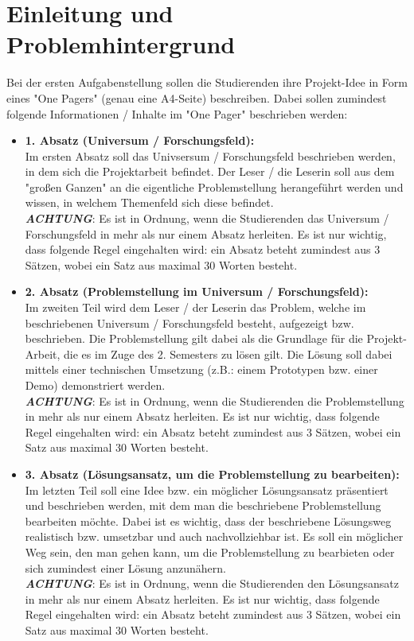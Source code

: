 \section{Einleitung und Problemhintergrund}

Bei der ersten Aufgabenstellung sollen die Studierenden ihre Projekt-Idee in Form eines "One Pagers" (genau eine A4-Seite) beschreiben. Dabei sollen zumindest folgende Informationen / Inhalte im "One Pager" beschrieben werden:
\begin{itemize}
	\item\textbf{1. Absatz (Universum / Forschungsfeld): } \\
	Im ersten Absatz soll das Univsersum / Forschungsfeld beschrieben werden, in dem sich die Projektarbeit befindet. Der Leser / die Leserin soll aus dem "großen Ganzen" an die eigentliche Problemstellung herangeführt werden und wissen, in welchem Themenfeld sich diese befindet. \\
	
	\textbf{\textit{ACHTUNG}}: Es ist in Ordnung, wenn die Studierenden das Universum / Forschungsfeld in mehr als nur einem Absatz herleiten. Es ist nur wichtig, dass folgende Regel eingehalten wird: ein Absatz beteht zumindest aus 3 Sätzen, wobei ein Satz aus maximal 30 Worten besteht.\\
	
	\item\textbf{2. Absatz (Problemstellung im Universum / Forschungsfeld): } \\
	Im zweiten Teil wird dem Leser / der Leserin das Problem, welche im beschriebenen Universum / Forschungsfeld besteht, aufgezeigt bzw. beschrieben. Die Problemstellung gilt dabei als die Grundlage für die Projekt-Arbeit, die es im Zuge des 2. Semesters zu lösen gilt. Die Lösung soll dabei mittels einer technischen Umsetzung (z.B.: einem Prototypen bzw. einer Demo) demonstriert werden. \\
	
	\textbf{\textit{ACHTUNG}}: Es ist in Ordnung, wenn die Studierenden die Problemstellung in mehr als nur einem Absatz herleiten. Es ist nur wichtig, dass folgende Regel eingehalten wird: ein Absatz beteht zumindest aus 3 Sätzen, wobei ein Satz aus maximal 30 Worten besteht.\\
	
	\item\textbf{3. Absatz (Lösungsansatz, um die Problemstellung zu bearbeiten): } \\
	Im letzten Teil soll eine Idee bzw. ein möglicher Lösungsansatz präsentiert und beschrieben werden, mit dem man die beschriebene Problemstellung bearbeiten möchte. Dabei ist es wichtig, dass der beschriebene Lösungsweg realistisch bzw. umsetzbar und auch nachvollziehbar ist. Es soll ein möglicher Weg sein, den man gehen kann, um die Problemstellung zu bearbieten oder sich zumindest einer Lösung anzunähern. \\
	
	\textbf{\textit{ACHTUNG}}: Es ist in Ordnung, wenn die Studierenden den Lösungsansatz in mehr als nur einem Absatz herleiten. Es ist nur wichtig, dass folgende Regel eingehalten wird: ein Absatz beteht zumindest aus 3 Sätzen, wobei ein Satz aus maximal 30 Worten besteht.
\end{itemize}